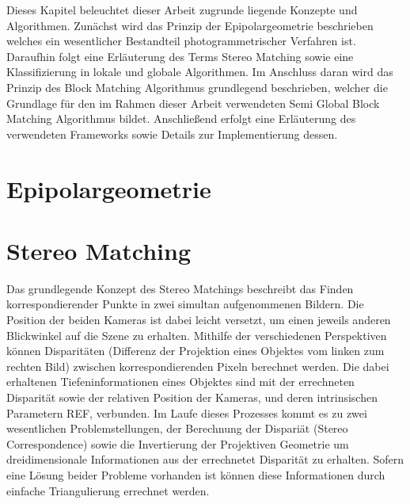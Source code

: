 Dieses Kapitel beleuchtet dieser Arbeit zugrunde liegende Konzepte und Algorithmen. Zunächst wird das Prinzip der Epipolargeometrie beschrieben welches ein wesentlicher Bestandteil photogrammetrischer Verfahren ist. Daraufhin folgt eine Erläuterung des Terms Stereo Matching sowie eine Klassifizierung in lokale und globale Algorithmen. Im Anschluss daran wird das Prinzip des Block Matching Algorithmus grundlegend beschrieben, welcher die Grundlage für den im Rahmen dieser Arbeit verwendeten Semi Global Block Matching Algorithmus bildet. Anschließend erfolgt eine Erläuterung des verwendeten Frameworks sowie Details zur Implementierung dessen.

\section{Epipolargeometrie}
\label{sec:epipolargeometrie}


\section{Stereo Matching}
\label{sec:stereo_matching}
Das grundlegende Konzept des Stereo Matchings beschreibt das Finden korrespondierender Punkte in zwei simultan aufgenommenen Bildern. Die Position der beiden Kameras ist dabei leicht versetzt, um einen jeweils anderen Blickwinkel auf die Szene zu erhalten. Mithilfe der verschiedenen Perspektiven können Disparitäten (Differenz der Projektion eines Objektes vom linken zum rechten Bild) zwischen korrespondierenden Pixeln berechnet werden. Die dabei erhaltenen Tiefeninformationen eines Objektes sind mit der errechneten Disparität sowie der relativen Position der Kameras, und deren intrinsischen Parametern REF, verbunden. Im Laufe dieses Prozesses kommt es zu zwei wesentlichen Problemstellungen, der Berechnung der Dispariät (Stereo Correspondence) sowie die Invertierung der Projektiven Geometrie um dreidimensionale Informationen aus der errechnetet Disparität zu erhalten. Sofern eine Lösung beider Probleme vorhanden ist können diese Informationen durch einfache Triangulierung errechnet werden.


